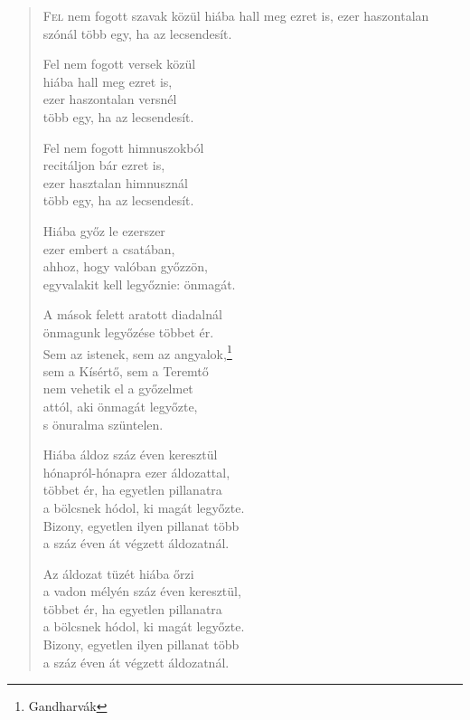 
\begin{verse}

{\par%
\lettrine{F}{el} {\LettrineTextFont nem fogott szavak közül}\newline
hiába hall meg ezret is,\newline
ezer haszontalan szónál\verselinebreak
több egy, ha az lecsendesít.
\par}

 Fel nem fogott versek közül\\
hiába hall meg ezret is,\\
ezer haszontalan versnél\\
több egy, ha az lecsendesít.

 Fel nem fogott himnuszokból\\
recitáljon bár ezret is,\\
ezer hasztalan himnusznál\\
több egy, ha az lecsendesít.

 Hiába győz le ezerszer\\
ezer embert a csatában,\\
ahhoz, hogy valóban győzzön,\\
egyvalakit kell legyőznie: önmagát.

 A mások felett aratott diadalnál\\
önmagunk legyőzése többet ér.\\
Sem az istenek, sem az angyalok,\footnote{Gandharvák}\\
sem a Kísértő, sem a Teremtő\\
nem vehetik el a győzelmet\\
attól, aki önmagát legyőzte,\\
s önuralma szüntelen.

 Hiába áldoz száz éven keresztül\\
hónapról-hónapra ezer áldozattal,\\
többet ér, ha egyetlen pillanatra\\
a bölcsnek hódol, ki magát legyőzte.\\
Bizony, egyetlen ilyen pillanat több\\
a száz éven át végzett áldozatnál.

 Az áldozat tüzét hiába őrzi\\
a vadon mélyén száz éven keresztül,\\
többet ér, ha egyetlen pillanatra\\
a bölcsnek hódol, ki magát legyőzte.\\
Bizony, egyetlen ilyen pillanat több\\
a száz éven át végzett áldozatnál.


\end{verse}
